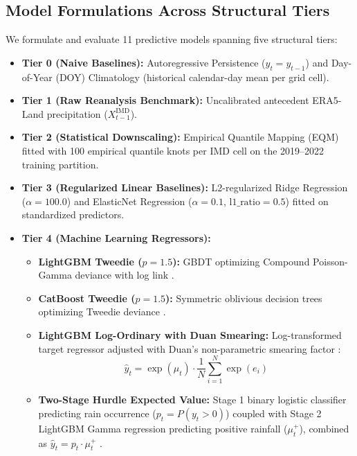 \documentclass[12pt]{article}
\begin{document}
\subsection{Model Formulations Across Structural Tiers}
We formulate and evaluate 11 predictive models spanning five structural tiers:
\begin{itemize}
    \item \textbf{Tier 0 (Naive Baselines):} Autoregressive Persistence ($y_t = y_{t-1}$) and Day-of-Year (DOY) Climatology (historical calendar-day mean per grid cell).
    \item \textbf{Tier 1 (Raw Reanalysis Benchmark):} Uncalibrated antecedent ERA5-Land precipitation ($X_{t-1}^{\text{IMD}}$).
    \item \textbf{Tier 2 (Statistical Downscaling):} Empirical Quantile Mapping (EQM) \cite{piani2011} fitted with 100 empirical quantile knots per IMD cell on the 2019--2022 training partition.
    \item \textbf{Tier 3 (Regularized Linear Baselines):} L2-regularized Ridge Regression ($\alpha = 100.0$) and ElasticNet Regression ($\alpha = 0.1$, $\text{l1\_ratio} = 0.5$) fitted on standardized predictors.
    \item \textbf{Tier 4 (Machine Learning Regressors):} 
    \begin{itemize}
        \item \textbf{LightGBM Tweedie ($p=1.5$):} GBDT optimizing Compound Poisson-Gamma deviance with log link \cite{ke2017}.
        \item \textbf{CatBoost Tweedie ($p=1.5$):} Symmetric oblivious decision trees optimizing Tweedie deviance \cite{prokhorenkova2018}.
        \item \textbf{LightGBM Log-Ordinary with Duan Smearing:} Log-transformed target regressor adjusted with Duan's non-parametric smearing factor \cite{duan1983}:
        \begin{equation}
        \hat{y}_t = \exp(\hat{\mu}_t) \cdot \frac{1}{N} \sum_{i=1}^N \exp(e_i)
        \end{equation}
        \item \textbf{Two-Stage Hurdle Expected Value:} Stage 1 binary logistic classifier predicting rain occurrence ($p_t = P(y_t > 0)$) coupled with Stage 2 LightGBM Gamma regression predicting positive rainfall ($\mu_t^+$), combined as $\hat{y}_t = p_t \cdot \mu_t^+$ \cite{cragg1971}.
    \end{itemize}
\end{itemize}
\end{document}
